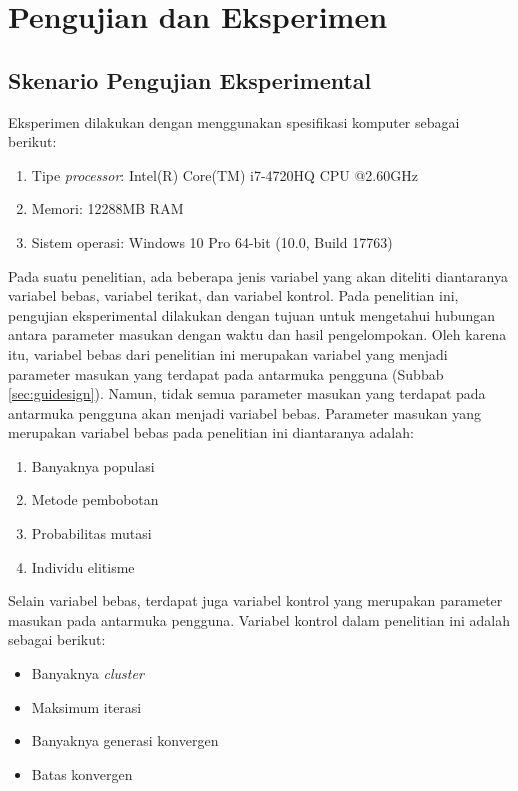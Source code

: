 \chapter{Pengujian dan Eksperimen}
\label{chap:testing}

\section{Skenario Pengujian Eksperimental}
\label{sec:exp-scenario}
Eksperimen dilakukan dengan menggunakan spesifikasi komputer sebagai berikut:

\begin{enumerate}
	\item Tipe \textit{processor}: Intel(R) Core(TM) i7-4720HQ CPU @2.60GHz
	\item Memori: 12288MB RAM
	\item Sistem operasi: Windows 10 Pro 64-bit (10.0, Build 17763)
\end{enumerate}

Pada suatu penelitian, ada beberapa jenis variabel yang akan diteliti diantaranya variabel bebas, variabel terikat, dan variabel kontrol. Pada penelitian ini, pengujian eksperimental dilakukan dengan tujuan untuk mengetahui hubungan antara parameter masukan dengan waktu dan hasil pengelompokan. Oleh karena itu, variabel bebas dari penelitian ini merupakan variabel yang menjadi parameter masukan yang terdapat pada antarmuka pengguna (Subbab \ref{sec:guidesign}). Namun, tidak semua parameter masukan yang terdapat pada antarmuka pengguna akan menjadi variabel bebas. Parameter masukan yang merupakan variabel bebas pada penelitian ini diantaranya adalah:

\begin{enumerate}
	\item Banyaknya populasi
	\item Metode pembobotan
	\item Probabilitas mutasi
	\item Individu elitisme
\end{enumerate}

Selain variabel bebas, terdapat juga variabel kontrol yang merupakan parameter masukan pada antarmuka pengguna. Variabel kontrol dalam penelitian ini adalah sebagai berikut:

\begin{itemize}
	\item Banyaknya \textit{cluster}
	\item Maksimum iterasi
	\item Banyaknya generasi konvergen
	\item Batas konvergen
\end{itemize}


